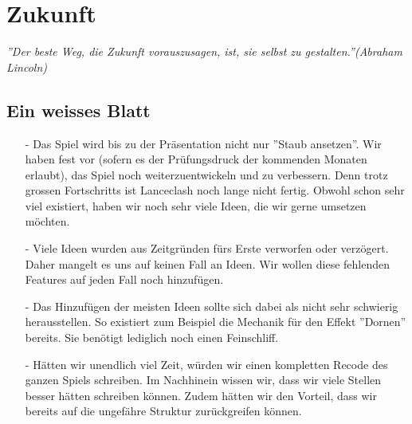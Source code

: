\chapter{Zukunft}
\textit{''Der beste Weg, die Zukunft vorauszusagen, ist, sie selbst zu gestalten.''(Abraham Lincoln)}

\section{Ein weisses Blatt}
\begin{itemize}
    \item[-] Das Spiel wird bis zu der Präsentation nicht nur ''Staub ansetzen''. Wir haben fest vor (sofern es der Prüfungsdruck der kommenden Monaten erlaubt), das Spiel noch weiterzuentwickeln und zu verbessern. Denn trotz grossen Fortschritts
    ist Lanceclash noch lange nicht fertig. Obwohl schon sehr viel existiert, haben wir noch sehr viele Ideen, die wir gerne umsetzen möchten.
    \item[-] Viele Ideen wurden aus Zeitgründen fürs Erste verworfen oder verzögert. Daher mangelt es uns auf keinen Fall an Ideen. Wir wollen diese
    fehlenden Features auf jeden Fall noch hinzufügen.
    \item[-] Das Hinzufügen der meisten Ideen sollte sich dabei als nicht sehr schwierig herausstellen. So existiert zum Beispiel die Mechanik für den Effekt ''Dornen'' bereits. 
    Sie benötigt lediglich noch einen Feinschliff. 
    \item[-] Hätten wir unendlich viel Zeit, würden wir einen kompletten Recode des ganzen Spiels schreiben. Im Nachhinein wissen wir, dass wir viele Stellen besser hätten schreiben können. 
    Zudem hätten wir den Vorteil, dass wir bereits auf die ungefähre Struktur zurückgreifen können. 
\end{itemize}

